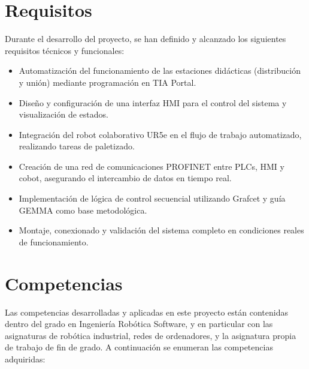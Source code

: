 \section{Requisitos}
\label{sec:requisitos}

Durante el desarrollo del proyecto, se han definido y alcanzado los siguientes requisitos técnicos y funcionales:

\begin{itemize}
	\item Automatización del funcionamiento de las estaciones didácticas (distribución y unión) mediante programación en TIA Portal.

	\item Diseño y configuración de una interfaz HMI para el control del sistema y visualización de estados.

	\item Integración del robot colaborativo UR5e en el flujo de trabajo automatizado, realizando tareas de paletizado.

	\item Creación de una red de comunicaciones PROFINET entre PLCs, HMI y cobot, asegurando el intercambio de datos en tiempo real.

	\item Implementación de lógica de control secuencial utilizando Grafcet y guía GEMMA como base metodológica.

	\item Montaje, conexionado y validación del sistema completo en condiciones reales de funcionamiento.
\end{itemize}

\section{Competencias}
\label{sec:competencias}

Las competencias desarrolladas y aplicadas en este proyecto están contenidas dentro del grado en Ingeniería Robótica Software, y en particular con las asignaturas de robótica industrial, redes de ordenadores, y la asignatura propia de trabajo de fin de grado. A continuación se enumeran las competencias adquiridas:

